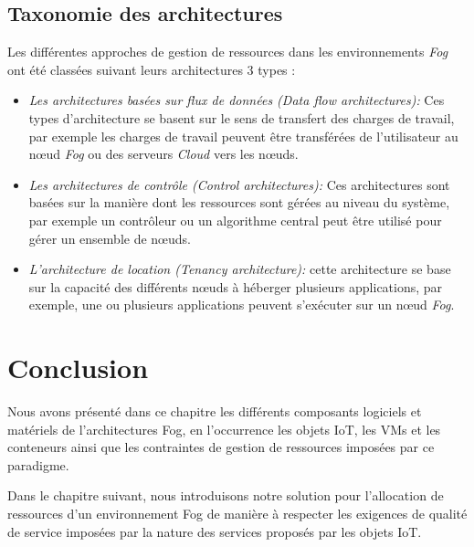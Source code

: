 \subsection{Taxonomie des architectures}
 Les différentes approches de gestion de ressources dans les environnements \emph{Fog} ont été classées suivant leurs architectures 3 types \cite{ch2019} :
 \begin{itemize}
  \item \emph{Les architectures basées sur flux de données (Data flow architectures):} Ces types d'architecture se basent sur le sens de transfert des charges de travail, par exemple les charges de travail peuvent être transférées de l'utilisateur au nœud \emph{Fog} ou des serveurs \emph{Cloud} vers les nœuds.
  \item \emph{Les architectures de contrôle (Control architectures):} Ces architectures sont basées sur la manière dont les ressources sont gérées au niveau du système, par exemple un contrôleur ou un algorithme central peut être utilisé pour gérer un ensemble de nœuds.
  \item \emph{L'architecture de location (Tenancy architecture):} cette architecture se base sur la capacité des différents nœuds à héberger plusieurs applications,  par exemple, une ou plusieurs applications peuvent s'exécuter sur un nœud \emph{Fog}.
\end{itemize}

\section{Conclusion}
Nous avons présenté dans ce chapitre les différents composants logiciels et matériels de l'architectures Fog, en l'occurrence les objets IoT, les VMs et les conteneurs ainsi que les contraintes de gestion de ressources imposées par ce paradigme.\par
Dans le chapitre suivant, nous introduisons notre solution pour l'allocation de ressources d'un environnement Fog de manière à respecter les exigences de qualité de service imposées par la nature des services proposés par les objets IoT.
